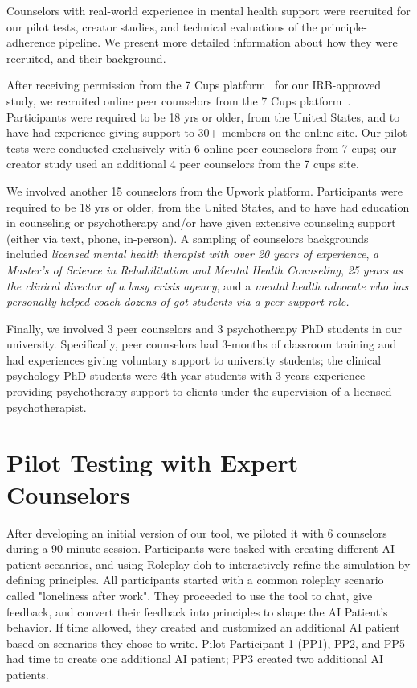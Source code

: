 \documentclass[11pt]{article}
\begin{document}
Counselors with real-world experience in mental health support were recruited for our pilot tests, creator studies, and technical evaluations of the principle-adherence pipeline. We present more detailed information about how they were recruited, and their background. 

After receiving permission from the 7 Cups platform~\cite{7cupswebsite} for our IRB-approved study, we recruited online peer counselors from the 7 Cups platform~\cite{7cupswebsite}. Participants were required to be 18 yrs or older, from the United States, and to have had experience giving support to 30+ members on the online site. Our pilot tests were conducted exclusively with 6 online-peer counselors from 7 cups; our creator study used an additional 4 peer counselors from the 7 cups site.

We involved another 15 counselors from the Upwork platform. Participants were required to be 18 yrs or older, from the United States, and to have had education in counseling or psychotherapy and/or have given extensive counseling support (either via text, phone, in-person). A sampling of counselors backgrounds included \textit{licensed mental health therapist with over 20 years of experience}, \textit{a Master's of Science in Rehabilitation and Mental Health Counseling}, \textit{25 years as the clinical director of a busy crisis agency}, and a \textit{mental health advocate who has personally helped coach dozens of got students via a peer support role.} 

Finally, we involved 3 peer counselors and 3 psychotherapy PhD students in our university. Specifically, peer counselors had 3-months of classroom training and had experiences giving voluntary support to university students; the clinical psychology PhD students were 4th year students with 3 years experience providing psychotherapy support to clients under the supervision of a licensed psychotherapist. 


\section{Pilot Testing with Expert Counselors}
\label{sec:appendix_formative}

After developing an initial version of our tool, we piloted it with 6 counselors during a 90 minute session. Participants were tasked with creating different AI patient sceanrios, and using Roleplay-doh to interactively refine the simulation by defining principles. All participants started with a common roleplay scenario called "loneliness after work". They proceeded to use the tool to chat, give feedback, and convert their feedback into principles to shape the AI Patient's behavior. If time allowed, they created and customized an additional AI patient based on scenarios they chose to write. 
Pilot Participant 1 (PP1), PP2, and PP5 had time to create one additional AI patient; PP3 created two additional AI patients.
\end{document}
